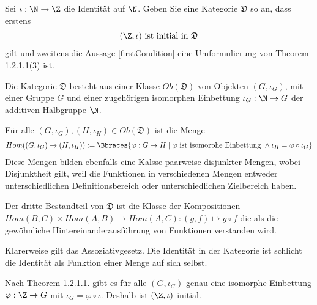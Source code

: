 \begin{exercise}
    Sei $\iota: \N \to \Z$ die Identität auf $\N$. Geben Sie eine Kategorie $\mathfrak{D}$ so an, dass erstens
    \begin{align}
        (\Z, \iota) \text{ ist initial in } \mathfrak{D} \label{firstCondition}
    \end{align}
    gilt und zweitens die Aussage \eqref{firstCondition} eine Umformulierung von Theorem 1.2.1.1(3) ist.
\end{exercise}

\begin{solution}
    Die Kategorie $\mathfrak{D}$ besteht aus einer Klasse $Ob(\mathfrak{D})$ von Objekten $(G, \iota_G)$, mit einer Gruppe $G$ und einer zugehörigen isomorphen Einbettung $\iota_G:\N \to G$ der additiven Halbgruppe $\N$. 
    
    Für alle $(G, \iota_G), (H, \iota_H) \in Ob(\mathfrak{D})$ ist die Menge 
    \begin{align*}
        Hom((G, \iota_G) \to (H, \iota_H)) := \Bbraces{\varphi:G \to H \mid \varphi \text{ ist isomorphe Einbettung } \land \iota_H = \varphi \circ \iota_G}
    \end{align*}
    Diese Mengen bilden ebenfalls eine Kalsse paarweise disjunkter Mengen, wobei Disjunktheit gilt, weil die Funktionen in verschiedenen Mengen entweder unterschiedlichen Definitionsbereich oder unterschiedlichen Zielbereich haben. 
    
    Der dritte Bestandteil von $\mathfrak{D}$ ist die Klasse der Kompositionen $Hom(B,C) \times Hom(A,B) \to Hom(A,C): (g,f) \mapsto g \circ f$ die als die gewöhnliche Hintereinanderausführung von Funktionen verstanden wird. 

    Klarerweise gilt das Assoziativgesetz. Die Identität in der Kategorie ist schlicht die Identität als Funktion einer Menge auf sich selbst.

    Nach Theorem 1.2.1.1. gibt es für alle $(G, \iota_G)$ genau eine isomorphe Einbettung $\varphi:\Z \to G$ mit $\iota_G = \varphi \circ \iota$. Deshalb ist $(\Z, \iota)$ initial.
\end{solution}